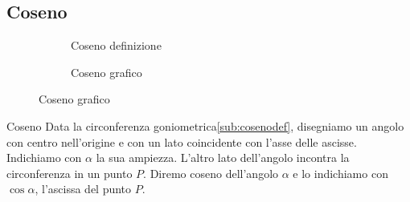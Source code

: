 \subsection{Coseno}
\label{sec:cosenogonio}
\begin{figure}
	\begin{subfigure}[b]{.5\linewidth}
		\centering
		
		\caption{Coseno definizione}\label{sub:cosenodef}
	\end{subfigure}%
	\begin{subfigure}[b]{.5\linewidth}
	\centering
		
		\caption{Coseno grafico}\label{sub:cosenograf}
	\end{subfigure}
	\label{ztzcos}
\end{figure}
\begin{definizionet}{Coseno}{}
Data la circonferenza goniometrica\nobs\vref{sub:cosenodef}, disegniamo un angolo con centro nell'origine e con un lato coincidente con l'asse delle ascisse. Indichiamo con $\alpha$ la sua ampiezza. L'altro lato dell'angolo incontra la circonferenza in un punto $P$. Diremo coseno dell'angolo $\alpha$ e lo indichiamo con $\cos\alpha$, l'ascissa del punto $P$.
\end{definizionet}
